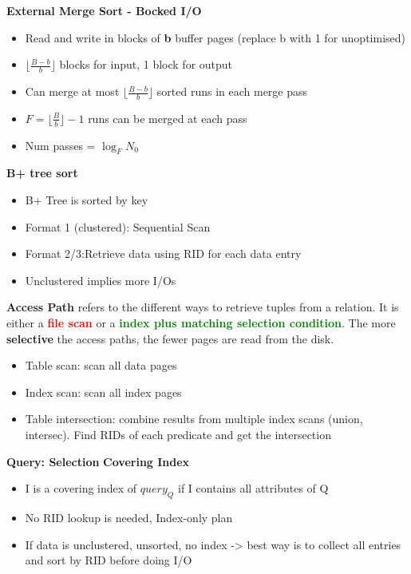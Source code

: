 \documentclass[10pt, landscape]{article}
\newcommand{\floor}[1]{\lfloor #1 \rfloor}
\begin{document}
\begin{multicols}{4}
\textbf{External Merge Sort - Bocked I/O}
\begin{itemize}
  \item Read and write in blocks of \textbf{b} buffer pages (replace b with 1 for unoptimised)
  \item $\floor{\frac{B-b}{b}}$ blocks for input, 1 block for output
  \item Can merge at most $\floor{\frac{B-b}{b}}$ sorted runs in each merge pass
  \item $F=\floor{\frac{B}{b}} - 1$ runs can be merged at each pass
  \item Num passes = $\log_{F} N_0$
\end{itemize}

\textbf{B+ tree sort}
\begin{itemize}
  \item B+ Tree is sorted by key
  \item Format 1 (clustered): Sequential Scan 
  \item Format 2/3:Retrieve data using RID for each data entry 
  \item Unclustered implies more I/Os
\end{itemize}

\textbf{Access Path} refers to the different ways to retrieve tuples from a relation. It is either a \textbf{\textcolor{red}{file scan}} or a \textbf{\textcolor{green}{index plus matching selection condition}}. The more \textbf{selective} the access paths, the fewer pages are read from the disk.
\begin{itemize}
  \item Table scan: scan all data pages 
  \item Index scan: scan all index pages 
  \item Table intersection: combine results from multiple index scans (union, intersec). Find RIDs of each predicate and get the intersection
\end{itemize}

\textbf{Query: Selection}
\textbf{Covering Index}
\begin{itemize}
  \item I is a covering index of $query_Q$ if I contains all attributes of Q
  \item No RID lookup is needed, Index-only plan
  \item If data is unclustered, unsorted, no index -> best way is to collect all entries and sort by RID before doing I/O 
\end{itemize}


\end{multicols}
\end{document}
